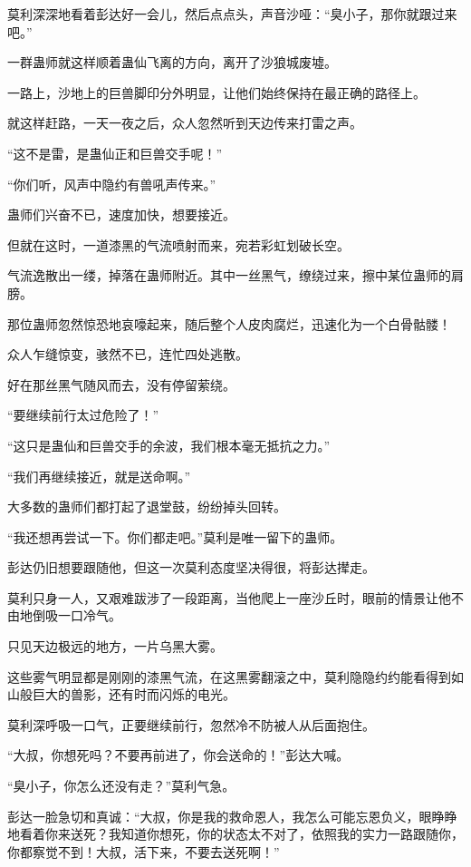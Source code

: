 \begin{this_body}
莫利深深地看着彭达好一会儿，然后点点头，声音沙哑：“臭小子，那你就跟过来吧。”

一群蛊师就这样顺着蛊仙飞离的方向，离开了沙狼城废墟。

一路上，沙地上的巨兽脚印分外明显，让他们始终保持在最正确的路径上。

就这样赶路，一天一夜之后，众人忽然听到天边传来打雷之声。

“这不是雷，是蛊仙正和巨兽交手呢！”

“你们听，风声中隐约有兽吼声传来。”

蛊师们兴奋不已，速度加快，想要接近。

但就在这时，一道漆黑的气流喷射而来，宛若彩虹划破长空。

气流逸散出一缕，掉落在蛊师附近。其中一丝黑气，缭绕过来，擦中某位蛊师的肩膀。

那位蛊师忽然惊恐地哀嚎起来，随后整个人皮肉腐烂，迅速化为一个白骨骷髅！

众人乍缝惊变，骇然不已，连忙四处逃散。

好在那丝黑气随风而去，没有停留萦绕。

“要继续前行太过危险了！”

“这只是蛊仙和巨兽交手的余波，我们根本毫无抵抗之力。”

“我们再继续接近，就是送命啊。”

大多数的蛊师们都打起了退堂鼓，纷纷掉头回转。

“我还想再尝试一下。你们都走吧。”莫利是唯一留下的蛊师。

彭达仍旧想要跟随他，但这一次莫利态度坚决得很，将彭达撵走。

莫利只身一人，又艰难跋涉了一段距离，当他爬上一座沙丘时，眼前的情景让他不由地倒吸一口冷气。

只见天边极远的地方，一片乌黑大雾。

这些雾气明显都是刚刚的漆黑气流，在这黑雾翻滚之中，莫利隐隐约约能看得到如山般巨大的兽影，还有时而闪烁的电光。

莫利深呼吸一口气，正要继续前行，忽然冷不防被人从后面抱住。

“大叔，你想死吗？不要再前进了，你会送命的！”彭达大喊。

“臭小子，你怎么还没有走？”莫利气急。

彭达一脸急切和真诚：“大叔，你是我的救命恩人，我怎么可能忘恩负义，眼睁睁地看着你来送死？我知道你想死，你的状态太不对了，依照我的实力一路跟随你，你都察觉不到！大叔，活下来，不要去送死啊！”


\end{this_body}
